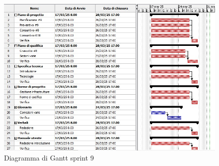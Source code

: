 \begin{figure}[h!]
    \centering
    \includegraphics[scale = 0.7]{template/images/gantt9.png}
    \caption{Diagramma di Gantt sprint 9}
    \label{fig:3.8} %
\end{figure}

